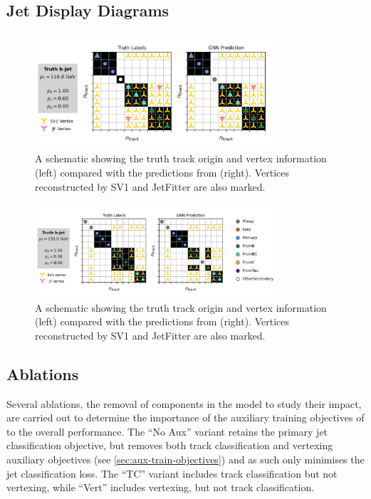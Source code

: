 \subsection{Jet Display Diagrams}

\begin{figure}[!p]
    \centering
    \includegraphics[width=0.8\textwidth]{chapters/gnn_tagger/figs/bjet_vertex.pdf}
    \caption{
        A schematic showing the truth track origin and vertex information (left) compared with the predictions from \GNN (right).
        Vertices reconstructed by SV1 and JetFitter are also marked.
    }
    \label{fig:bjet_diag_1}
 \end{figure}


 \begin{figure}[!p]
    \centering
    \includegraphics[width=0.8\textwidth]{chapters/gnn_tagger/figs/bjet_vertex2.pdf}
    \caption{
        A schematic showing the truth track origin and vertex information (left) compared with the predictions from \GNN (right).
        Vertices reconstructed by SV1 and JetFitter are also marked.
    }
    \label{fig:bjet_diag_2}
 \end{figure}

 

\subsection{Ablations}\label{sec:gnn_ablations}

Several ablations, the removal of components in the model to study their impact, are carried out to determine the importance of the auxiliary training objectives of \GNN to the overall performance.
The ``\GNN No Aux'' variant retains the primary jet classification objective, but removes both track classification and vertexing auxiliary objectives (see \cref{sec:aux-train-objectives}) and as such only minimises the jet classification loss.
The ``\GNN TC'' variant includes track classification but not vertexing, while ``\GNN Vert'' includes vertexing, but not track classification.

